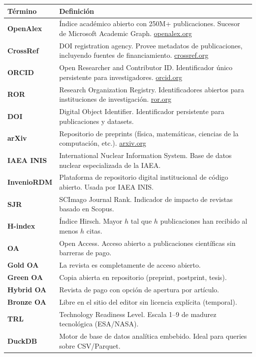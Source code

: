 \documentclass[12pt,a4paper]{report}
\begin{document}
\begin{longtable}{L{4cm} L{10cm}}
  \toprule
  \textbf{Término} & \textbf{Definición} \\
  \midrule
  \endhead
  \textbf{OpenAlex} & Índice académico abierto con 250M+ publicaciones. Sucesor de Microsoft Academic Graph. \url{openalex.org} \\
  \textbf{CrossRef} & DOI registration agency. Provee metadatos de publicaciones, incluyendo fuentes de financiamiento. \url{crossref.org} \\
  \textbf{ORCID} & Open Researcher and Contributor ID. Identificador único persistente para investigadores. \url{orcid.org} \\
  \textbf{ROR} & Research Organization Registry. Identificadores abiertos para instituciones de investigación. \url{ror.org} \\
  \textbf{DOI} & Digital Object Identifier. Identificador persistente para publicaciones y datasets. \\
  \textbf{arXiv} & Repositorio de preprints (física, matemáticas, ciencias de la computación, etc.). \url{arxiv.org} \\
  \textbf{IAEA INIS} & International Nuclear Information System. Base de datos nuclear especializada de la IAEA. \\
  \textbf{InvenioRDM} & Plataforma de repositorio digital institucional de código abierto. Usada por IAEA INIS. \\
  \textbf{SJR} & SCImago Journal Rank. Indicador de impacto de revistas basado en Scopus. \\
  \textbf{H-index} & Índice Hirsch. Mayor $h$ tal que $h$ publicaciones han recibido al menos $h$ citas. \\
  \textbf{OA} & Open Access. Acceso abierto a publicaciones científicas sin barreras de pago. \\
  \textbf{Gold OA} & La revista es completamente de acceso abierto. \\
  \textbf{Green OA} & Copia abierta en repositorio (preprint, postprint, tesis). \\
  \textbf{Hybrid OA} & Revista de pago con opción de apertura por artículo. \\
  \textbf{Bronze OA} & Libre en el sitio del editor sin licencia explícita (temporal). \\
  \textbf{TRL} & Technology Readiness Level. Escala 1--9 de madurez tecnológica (ESA/NASA). \\
  \textbf{DuckDB} & Motor de base de datos analítica embebido. Ideal para queries sobre CSV/Parquet. \\

\end{longtable}
\end{document}
